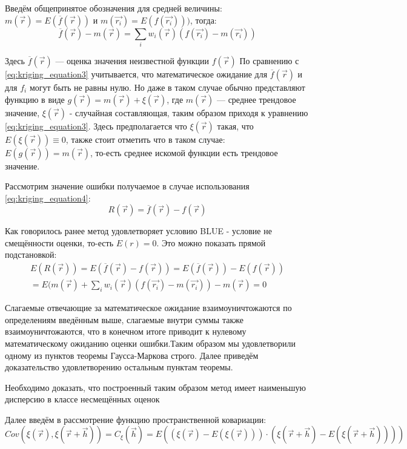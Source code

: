 Введём общепринятое обозначения для средней величины: $m(\vec{r}) = E(\overline{f}(\vec{r}))$ и $m(\vec{r_i}) = E(f(\vec{r_i})))$, тогда:
\begin{equation}
  \label{eq:kriging_equation4_1}
  \overline{f}(\vec{r}) - m(\vec{r}) =  \sum_{i} w_i(\vec{r}) (f(\vec{r_i}) - m(\vec{r_i}))
\end{equation}

Здесь $\overline{f}(\vec{r})$ — оценка значения неизвестной функции $f(\vec{r})$
По сравнению с \eqref{eq:kriging_equation3} учитывается, что математическое ожидание для $\overline{f}(\vec{r})$ и для $f_i$ могут быть не равны нулю. Но даже в таком случае обычно представляют функцию в виде $g(\vec{r}) = m(\vec{r}) + \xi(\vec{r})$, где $m(\vec{r})$ — среднее трендовое значение, $\xi(\vec{r})$ - случайная составляющая, таким образом приходя к уравнению \eqref{eq:kriging_equation3}. Здесь предполагается что $\xi(\vec{r})$ такая, что $E(\xi(\vec{r})) \equiv 0$, также стоит отметить что в таком случае: $E(g(\vec{r})) = m(\vec{r})$, то-есть среднее искомой функции есть трендовое значение.

Рассмотрим значение ошибки получаемое в случае использования \eqref{eq:kriging_equation4}:
\begin{equation}
  \label{eq:kriging_equation5}
  R(\vec{r}) = \overline{f}(\vec{r}) - f(\vec{r})
\end{equation}

Как говорилось ранее метод удовлетворяет условию BLUE - условие не смещённости оценки, то-есть $E(r) = 0$. Это можно показать прямой подстановкой:
\begin{align}
      E(R(\vec{r})) = E(\overline{f}(\vec{r}) - f(\vec{r})) = E(\overline{f}(\vec{r})) - E(f(\vec{r})) \nonumber \\
      = E(m(\vec{r}) +  \sum_{i} w_i(\vec{r}) (f(\vec{r_i}) - m(\vec{r_i})) - m(\vec{r}) = 0
\end{align}

Слагаемые отвечающие за математическое ожидание взаимоуничтожаются по определениям введённым выше, слагаемые внутри суммы также взаимоуничтожаются, что в конечном итоге приводит к нулевому математическому ожиданию оценки ошибки.Таким образом мы удовлетворили одному из пунктов теоремы Гаусса-Маркова строго. Далее приведём доказательство удовлетворению остальным пунктам теоремы.

Необходимо доказать, что построенный таким образом метод имеет наименьшую дисперсию в классе несмещённых оценок

Далее введём в рассмотрение функцию пространственной ковариации:
\begin{equation}
  \label{eq:kriging_equation6}
  Cov(\xi(\vec{r}), \xi(\vec{r} + \vec{h})) = C_{\xi}(\vec{h})
  = E((\xi(\vec{r}) - E(\xi(\vec{r}))) \cdot (\xi(\vec{r} + \vec{h}) - E(\xi(\vec{r} + \vec{h}))))
\end{equation}

